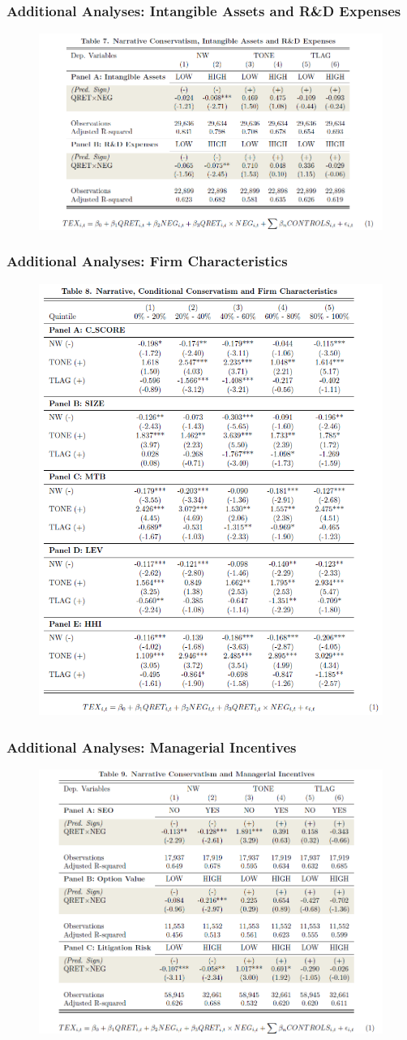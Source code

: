 \documentclass{beamer}
\begin{document}
\begin{frame}
	\frametitle{Additional Analyses: Intangible Assets and R\&D Expenses}
	\begin{figure}[h]
	\centering
	\includegraphics[width=0.7\linewidth]{tab7}
	\label{tab7}
	\end{figure}
	
\end{frame}
\begin{frame}
	\frametitle{Additional Analyses: Firm Characteristics}
	\begin{figure}[h]
		\centering
		\includegraphics[width=0.5\linewidth]{tab8}
		\label{tab8}
	\end{figure}
	
\end{frame}
\begin{frame}
	\frametitle{Additional Analyses: Managerial Incentives}
	\begin{figure}[h]
	\centering
	\includegraphics[width=0.7\linewidth]{tab9}
	\label{tab9}
	\end{figure}
\end{frame}
\end{document}
